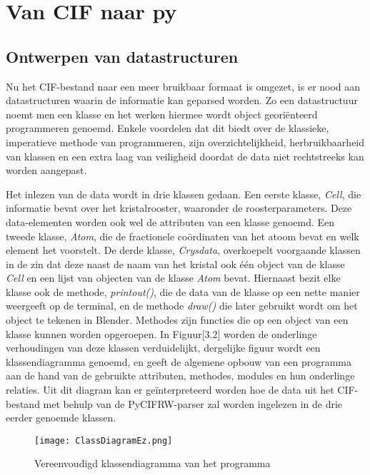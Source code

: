 \section{Van CIF naar py}

\subsection{Ontwerpen van datastructuren}
Nu het CIF-bestand naar een meer bruikbaar formaat is omgezet, is er nood aan datastructuren waarin de informatie kan geparsed worden. Zo een datastructuur noemt men een klasse en het werken hiermee wordt object georiënteerd programmeren genoemd. Enkele voordelen dat dit biedt over de klassieke, imperatieve methode van programmeren, zijn overzichtelijkheid, herbruikbaarheid van klassen en een extra laag van veiligheid doordat de data niet rechtstreeks kan worden aangepast.
\par
Het inlezen van de data wordt in drie klassen gedaan. Een eerste klasse, \textit{Cell}, die informatie bevat over het kristalrooster, waaronder de roosterparameters. Deze data-elementen worden ook wel de attributen van een klasse genoemd. Een tweede klasse, \textit{Atom}, die de fractionele coördinaten van het atoom bevat en welk element het voorstelt. De derde klasse, \textit{Crysdata}, overkoepelt voorgaande klassen in de zin dat deze naast de naam van het kristal ook één object van de klasse \textit{Cell} en een lijst van objecten van de klasse \textit{Atom} bevat. Hiernaast bezit elke klasse ook de methode, \textit{printout()}, die de data van de klasse op een nette manier weergeeft op de terminal, en de methode \textit{draw()} die later gebruikt wordt om het object te tekenen in Blender. Methodes zijn functies die op een object van een klasse kunnen worden opgeroepen.  In Figuur[3.2] worden de onderlinge verhoudingen van deze klassen verduidelijkt, dergelijke figuur wordt een klassendiagramma genoemd, en geeft de algemene opbouw van een programma aan de hand van de gebruikte attributen, methodes, modules en hun onderlinge relaties. Uit dit diagram kan er geïnterpreteerd worden hoe de data uit het CIF-bestand met behulp van de PyCIFRW-parser zal worden ingelezen in de drie eerder genoemde klassen.

\begin{figure}[h]
\texttt{[image: ClassDiagramEz.png]}
\caption{Vereenvoudigd klassendiagramma van het programma}
\end{figure}

